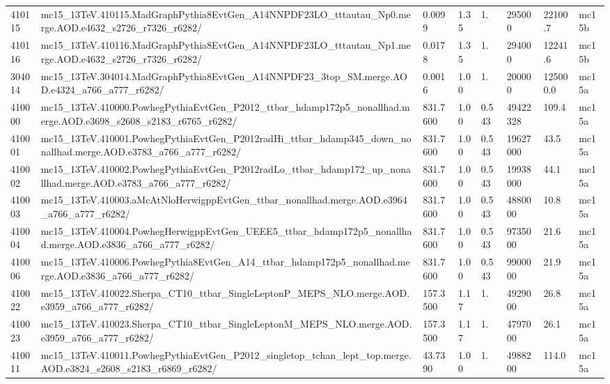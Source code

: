 \begin{sidewaystable}[!hp]
\begin{center}
{\begin{tabular}{llllllll}
410115  &  mc15\_13TeV.410115.MadGraphPythia8EvtGen\_A14NNPDF23LO\_tttautau\_Np0.merge.AOD.e4632\_s2726\_r7326\_r6282/  &  0.0099  &  1.35  &  1.  &  295000  &  22100.7  &  mc15b \\
410116  &  mc15\_13TeV.410116.MadGraphPythia8EvtGen\_A14NNPDF23LO\_tttautau\_Np1.merge.AOD.e4632\_s2726\_r7326\_r6282/  &  0.0178  &  1.35 &  1.  &  294000  &  12241.6  &  mc15b \\
304014  &  mc15\_13TeV.304014.MadGraphPythia8EvtGen\_A14NNPDF23\_3top\_SM.merge.AOD.e4324\_a766\_a777\_r6282/  &  0.0016  &  1.00  &  1.  &  200000  &  125000.0  &  mc15a \\
\hline
410000  &  mc15\_13TeV.410000.PowhegPythiaEvtGen\_P2012\_ttbar\_hdamp172p5\_nonallhad.merge.AOD.e3698\_s2608\_s2183\_r6765\_r6282/  &  831.7600  &  1.00  &  0.543  &  49422328  &  109.4  &  mc15a \\
410001  &  mc15\_13TeV.410001.PowhegPythiaEvtGen\_P2012radHi\_ttbar\_hdamp345\_down\_nonallhad.merge.AOD.e3783\_a766\_a777\_r6282/  &  831.7600  &  1.00  &  0.543  &  19627000  &  43.5  &  mc15a \\
410002  &  mc15\_13TeV.410002.PowhegPythiaEvtGen\_P2012radLo\_ttbar\_hdamp172\_up\_nonallhad.merge.AOD.e3783\_a766\_a777\_r6282/  &  831.7600  &  1.00  &  0.543  &  19938000  &  44.1  &  mc15a \\
410003  &  mc15\_13TeV.410003.aMcAtNloHerwigppEvtGen\_ttbar\_nonallhad.merge.AOD.e3964\_a766\_a777\_r6282/  &  831.7600  &  1.00  &  0.543  &  4880000  &  10.8  &  mc15a \\
410004  &  mc15\_13TeV.410004.PowhegHerwigppEvtGen\_UEEE5\_ttbar\_hdamp172p5\_nonallhad.merge.AOD.e3836\_a766\_a777\_r6282/  &  831.7600  &  1.00  &  0.543  &  9735000  &  21.6  &  mc15a \\
410006  &  mc15\_13TeV.410006.PowhegPythia8EvtGen\_A14\_ttbar\_hdamp172p5\_nonallhad.merge.AOD.e3836\_a766\_a777\_r6282/  &  831.7600  &  1.00  &  0.543  &  9900000  &  21.9  &  mc15a \\
410022  &  mc15\_13TeV.410022.Sherpa\_CT10\_ttbar\_SingleLeptonP\_MEPS\_NLO.merge.AOD.e3959\_a766\_a777\_r6282/  &  157.3500  &  1.17  &  1.  &  4929000  &  26.8  &  mc15a \\
410023  &  mc15\_13TeV.410023.Sherpa\_CT10\_ttbar\_SingleLeptonM\_MEPS\_NLO.merge.AOD.e3959\_a766\_a777\_r6282/  &  157.3500  &  1.17  &  1.  &  4797000  &  26.1  &  mc15a \\
410011  &  mc15\_13TeV.410011.PowhegPythiaEvtGen\_P2012\_singletop\_tchan\_lept\_top.merge.AOD.e3824\_s2608\_s2183\_r6869\_r6282/  &  43.7390  &  1.00  &  1.  &  4988200  &  114.0  &  mc15a \\

\end{tabular}}
\end{center}
\end{sidewaystable}
